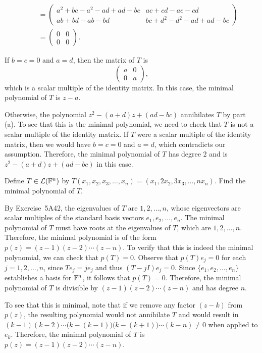 \begin{exc}
\begin{solution}
\begin{parts}
\begin{align*}
  &\quad=\begin{pmatrix} a^2+bc-a^2-ad+ad-bc & ac+cd-ac-cd\\
     ab+bd-ab-bd & bc+d^2-d^2-ad+ad-bc \end{pmatrix}\\
  &\quad=\begin{pmatrix} 0 & 0\\ 0 & 0 \end{pmatrix}.
  \end{align*}
\item If $b=c=0$ and $a=d$, then the matrix of $T$ is
  \[ \begin{pmatrix} a & 0\\ 0 & a \end{pmatrix}, \]
  which is a scalar multiple of the identity matrix. In this case, the minimal
  polynomial of $T$ is $z-a$.

  Otherwise, the polynomial $z^2-(a+d)z+(ad-bc)$ annihilates $T$ by part (a).
  To see that this is the minimal polynomial, we need to check that $T$ is not
  a scalar multiple of the identity matrix. If $T$ were a scalar multiple of
  the identity matrix, then we would have $b=c=0$ and $a=d$, which contradicts
  our assumption. Therefore, the minimal polynomial of $T$ has degree $2$ and
  is $z^2-(a+d)z+(ad-bc)$ in this case. \qedhere
\end{parts}
\end{solution}

\begin{exercise}
Define $T\in\mathcal{L}(\mathbb{F}^n)$ by
$T(x_1,x_2,x_3,\dots,x_n)=(x_1,2x_2,3x_3,\dots,nx_n)$. Find the minimal
polynomial of $T$.
\end{exercise}
\begin{solution}
By Exercise~5A42, the eigenvalues of $T$ are $1,2,\dots,n$, whose eigenvectors
are scalar multiples of the standard basis vectors $e_1,e_2,\dots,e_n$. The
minimal polynomial of $T$ must have roots at the eigenvalues of $T$, which are
$1,2,\dots,n$. Therefore, the minimal polynomial is of the form
$p(z)=(z-1)(z-2)\cdots(z-n)$. To verify that this is indeed the minimal
polynomial, we can check that $p(T)=0$. Observe that $p(T)e_j=0$ for each
$j=1,2,\dots,n$, since $Te_j=je_j$ and thus $(T-jI)e_j=0$. Since
$\{e_1,e_2,\dots,e_n\}$ establishes a basis for $\mathbb{F}^n$, it follows that
$p(T)=0$. Therefore, the minimal polynomial of $T$ is divisible by
$(z-1)(z-2)\cdots(z-n)$ and has degree $n$.

To see that this is minimal, note that if we remove any factor $(z-k)$ from
$p(z)$, the resulting polynomial would not annihilate $T$ and would result in
$(k-1)(k-2)\cdots\bigl(k-(k-1)\bigr)\bigl(k-(k+1)\bigr)\cdots(k-n)\ne0$ when
applied to $e_k$. Therefore, the minimal polynomial of $T$ is
$p(z)=(z-1)(z-2)\cdots(z-n)$.
\end{solution}


\end{exc}
